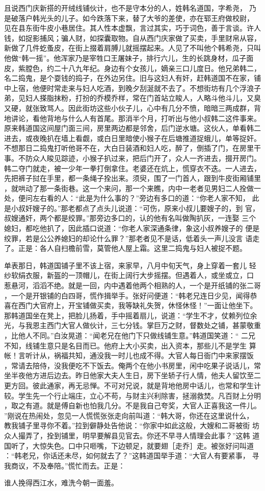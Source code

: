 且说西门庆新搭的开绒线铺伙计，也不是守本分的人，姓韩名道国，字希尧，
乃是破落户韩光头的儿子。如今跌落下来，替了大爷的差使，亦在郓王府做校尉，
见在县东街牛皮小巷居住。其人性本虚飘，言过其实，巧于词色，善于言谈。许人
钱，如捉影捕风；骗人财，如探囊取物。自从西门庆家做了买卖，手里财帛从容，
新做了几件虼蚤皮，在街上掇着肩膊儿就摇摆起来。人见了不叫他个韩希尧，只叫
他做“韩一摇”。他浑家乃是宰牲口王屠妹子，排行六儿，生的长跳身材，瓜子面
皮，紫膛色，约二十八九年纪。身边有个女孩儿，嫡亲三口儿度日。他兄弟韩二，
名二捣鬼，是个耍钱的捣子，在外边另住。旧与这妇人有奸，赶韩道国不在家，铺
中上宿，他便时常走来与妇人吃酒，到晚夕刮涎就不去了。不想街坊有几个浮浪子
弟，见妇人搽脂抹粉，打扮的乔模乔样，常在门首站立睃人，人略斗他斗儿，又臭
又硬，就张致骂人。因此街坊这些小伙子儿，心中有几分不愤，暗暗三两成群，背
地讲论，看他背地与什么人有首尾。那消半个月，打听出与他小叔韩二这件事来。
原来韩道国这间屋门面三间，房里两边都是邻舍，后门逆水塘。这伙人，单看韩二
进去，或夜晚扒在墙上看觑，或白日里暗使小猴子在后塘推道捉蛾儿，单等捉奸。
不想那日二捣鬼打听他哥不在，大白日装酒和妇人吃，醉了，倒插了门，在房里干
事。不防众人睃见踪迹，小猴子扒过来，把后门开了，众人一齐进去，掇开房门。
韩二夺门就走，被一少年一拳打倒拿住。老婆还在炕上，慌穿衣不迭。一人进去，
先把裤子挝在手里，都一条绳子拴出来。须臾，围了一门首人，跟到牛皮街厢铺里
，就哄动了那一条街巷。这一个来问，那一个来瞧，内中一老者见男妇二人拴做一
处，便问左右看的人：“此是为什么事的？”旁边有多口的道：“你老人家不知，
此是小叔奸嫂子的。”那老都点了点头儿说道：“可伤，原来小叔儿要嫂子的，到
官，叔嫂通奸，两个都是绞罪。”那旁边多口的，认的他有名叫做陶扒灰，一连娶
三个媳妇，都吃他扒了，因此插口说道：“你老人家深通条律，象这小叔养嫂子的
便是绞罪，若是公公养媳妇的却论什么罪？”那老者见不是话，低着头一声儿没言
语走了。正是：各人自扫檐前雪，莫管他人屋上霜。这里二捣鬼与妇人被捉不题。

单表那日，韩道国铺子里不该上宿，来家早，八月中旬天气，身上穿着一套儿
轻纱软绢衣服，新盔的一顶帽儿，在街上阔行大步摇摆。但遇着人，或坐或立，口
惹悬河，滔滔不绝。就是一回，内中遇着他两个相熟的人，一个是开纸铺的张二哥
，一个是开银铺的白四哥，慌作揖举手。张好问便道：“韩老兄连日少见，闻得恭
喜在西门大官府上，开宝铺做买卖，我等缺礼失贺，休怪休怪！”一面让他坐下。
那韩道国坐在凳上，把脸儿扬着，手中摇着扇儿，说道：“学生不才，仗赖列位余
光，与我恩主西门大官人做伙计，三七分钱。掌巨万之财，督数处之铺，甚蒙敬重
，比他人不同。”白汝晃道：“闻老兄在他门下只做线铺生意。”韩道国笑道：“
二兄不知，线铺生意只是名目而已。他府上大小买卖，出入资本，那些儿不是学生
算帐！言听计从，祸福共知，通没我一时儿也成不得。大官人每日衙门中来家摆饭
，常请去陪侍，没我便吃不下饭去。俺两个在他小书房里，闲中吃果子说话儿，常
坐半夜他方进后边去。昨日他家大夫人生日，房下坐轿子行人情，他夫人留饮至二
更方回。彼此通家，再无忌惮。不可对兄说，就是背地他房中话儿，也常和学生计
较。学生先一个行止端庄，立心不苟，与财主兴利除害，拯溺救焚。凡百财上分明
，取之有道。就是傅自新也怕我几分。不是我自己夸奖，大官人正喜我这一件儿。
”刚说在热闹处，忽见一人慌慌张张走向前叫道：“韩大哥，你还在这里说什么，
教我铺子里寻你不着。”拉到僻静处告他说：“你家中如此这般，大嫂和二哥被街
坊众人撮弄了，拴到铺里，明早要解县见官去。你还不早寻人情理会此事？”这韩
道国听了，大惊失色。口中只咂嘴，下边顿足，就要翅［走乔］走。被张好问叫道
：“韩老兄，你话还未尽，如何就去了？”这韩道国举手道：“大官人有要紧事，
寻我商议，不及奉陪。”慌忙而去。正是：

谁人挽得西江水，难洗今朝一面羞。